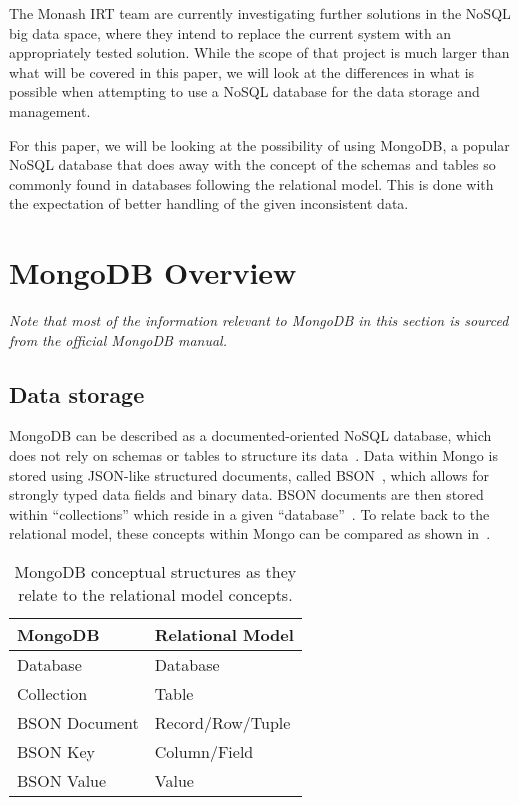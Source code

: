 \documentclass[a4paper,11pt]{article}
\begin{document}
The Monash IRT team are currently investigating further solutions in the NoSQL big data space, where they intend to
replace the current system with an appropriately tested solution. While the scope of that project is much larger than
what will be covered in this paper, we will look at the differences in what is possible when attempting to use a NoSQL
database for the data storage and management.

For this paper, we will be looking at the possibility of using MongoDB, a popular NoSQL database that does away with
the concept of the schemas and tables so commonly found in databases following the relational model. This is done with
the expectation of better handling of the given inconsistent data.


\newpage

\section{MongoDB Overview} %
\label{sec:mongo_overview}

\textit{Note that most of the information relevant to MongoDB in this section is sourced from the official MongoDB
manual.}~\cite{Mongo_man}

\subsection{Data storage} %
\label{sub:data_storage}

MongoDB can be described as a documented-oriented NoSQL database, which does not rely on schemas or tables to structure
its data~\cite{parker2013comparing}. Data within Mongo is stored using JSON-like structured documents, called
BSON~\cite{bsons6:online}, which allows for strongly typed data fields and binary data. BSON documents are then stored
within ``collections'' which reside in a given ``database''~\cite{parker2013comparing}. To relate back to the relational
model, these concepts within Mongo can be compared as shown in~.

\begin{table}[h]
\centering
\caption{MongoDB conceptual structures as they relate to the relational model concepts.}
\label{tab:mongo_to_relational}
\begin{tabular}{ | l | l | }

\hline
\textbf{MongoDB}  & \textbf{Relational Model} \\ \hline
Database          & Database                  \\ \hline
Collection        & Table                     \\ \hline
BSON Document     & Record/Row/Tuple          \\ \hline
BSON Key          & Column/Field              \\ \hline
BSON Value        & Value                     \\ \hline

\end{tabular}
\end{table}
\end{document}
